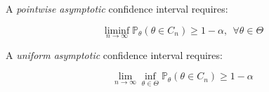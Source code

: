 A \textit{pointwise asymptotic} confidence interval requires:

\begin{equation}
\liminf_{n\rightarrow \infty} \mathbb{P}_{\theta}(\theta \in C_n) \geq 1-\alpha,	\ \ \forall \theta \in \Theta
\end{equation}   

A \textit{uniform asymptotic} confidence interval requires:

\begin{equation}
\lim_{n\rightarrow \infty}\inf_{\theta \in \Theta} \mathbb{P}_{\theta}(\theta \in C_n) \geq 1-\alpha
\end{equation}

